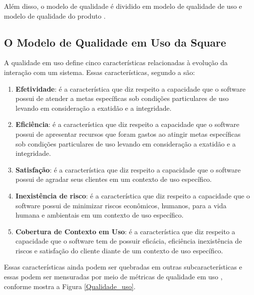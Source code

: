 Além disso, o modelo de qualidade  é dividido em modelo de qualidade de uso e modelo de qualidade do produto \cite{iso_25000}.

%



\subsection{O Modelo de Qualidade em Uso da Square}

A qualidade em uso define cinco características relacionadas à evolução da interação com um sistema. Essas características, segundo a  são:

\begin{enumerate}
 \item \textbf{Efetividade}: é a característica que diz respeito a capacidade que o software possui de atender a metas específicas sob condições particulares de uso levando em consideração a exatidão e a integridade.
 
\item \textbf{Eficiência}: é a característica que diz respeito a capacidade que o software possui de apresentar recursos que foram gastos ao atingir metas específicas sob condições particulares de uso levando em consideração a exatidão e a integridade.

\item \textbf{Satisfação}: é a característica que diz respeito a capacidade que o software possui de agradar seus clientes em um contexto de uso específico.


\item \textbf{Inexistência de risco}: é a característica que diz respeito a capacidade que o software possui de minimizar riscos econômicos, humanos, para a vida humana e ambientais em um contexto de uso específico.

\item \textbf{Cobertura de Contexto em Uso}:  é a característica que diz respeito a capacidade que o software tem de possuir eficácia, eficiência inexistência de riscos e satisfação do cliente diante de um contexto de uso específico.


\end{enumerate}


Essas características ainda podem ser quebradas em outras subcaracterísticas e essas podem ser mensuradas por meio de métricas de qualidade em uso , conforme mostra a Figura \ref{Qualidade_uso}.

